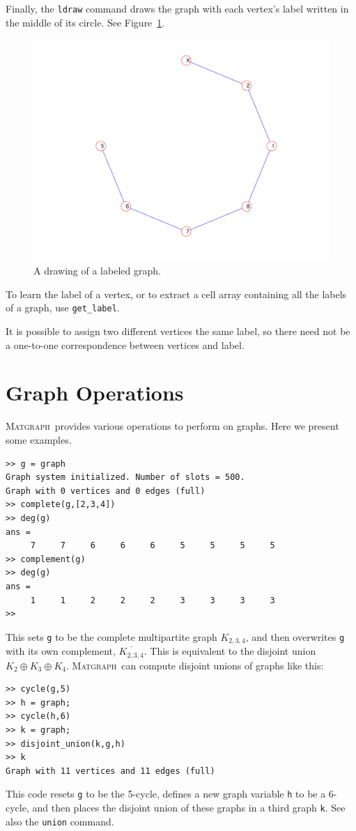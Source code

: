 \documentclass[12pt]{amsart}
\newcommand\matgraph{\textsc{Matgraph}}
\begin{document}
Finally, the \verb|ldraw| command draws the graph with each vertex's
label written in the middle of its circle. See
Figure~\ref{fig:labeled-path}. 
\begin{figure}[ht]
  \begin{center}
    \includegraphics[scale=0.5]{figs/labeled-path}
  \end{center}
  \caption{A drawing of a labeled graph.}
  \label{fig:labeled-path}
\end{figure}

To learn the label of a vertex, or to extract a cell array containing
all the labels of a graph, use \verb|get_label|. 

It is possible to assign two different vertices the same label, so
there need not be a one-to-one correspondence between vertices and
label. 


\section{Graph Operations}
\label{sect:ops}

\matgraph\ provides various operations to perform on graphs. Here we
present some examples.
\begin{verbatim}
>> g = graph
Graph system initialized. Number of slots = 500.
Graph with 0 vertices and 0 edges (full)
>> complete(g,[2,3,4])
>> deg(g)
ans =
     7     7     6     6     6     5     5     5     5
>> complement(g)
>> deg(g)
ans =
     1     1     2     2     2     3     3     3     3
>> 
\end{verbatim}
This sets \verb|g| to be the complete multipartite graph $K_{2,3,4}$,
and then overwrites \verb|g| with its own complement,
$\overline{K_{2,3,4}}$. This is equivalent to the disjoint union
$K_2\oplus K_3 \oplus K_4$. \matgraph\ can compute disjoint unions of
graphs like this:
\begin{verbatim}
>> cycle(g,5)
>> h = graph;
>> cycle(h,6)
>> k = graph;
>> disjoint_union(k,g,h)
>> k
Graph with 11 vertices and 11 edges (full)
\end{verbatim}
This code resets \verb|g| to be the 5-cycle, defines a new graph
variable \verb|h| to be a 6-cycle, and then places the disjoint union
of these graphs in a third graph \verb|k|. See also the \verb|union|
command. 
\end{document}
